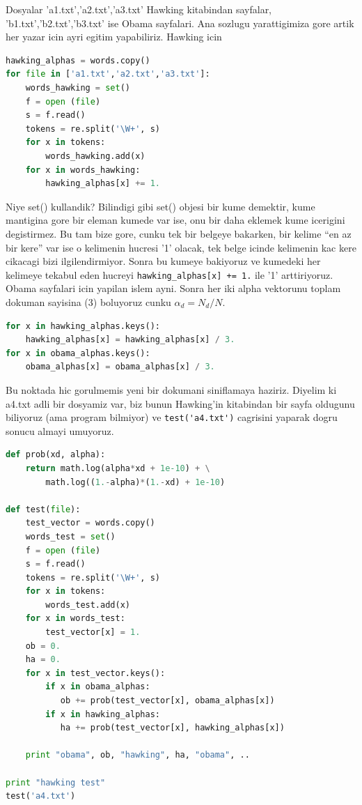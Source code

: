 \documentclass[12pt,fleqn]{article}
\begin{document}
Dosyalar 'a1.txt','a2.txt','a3.txt' Hawking kitabindan sayfalar,
'b1.txt','b2.txt','b3.txt' ise Obama sayfalari. Ana sozlugu yarattigimiza gore
artik her yazar icin ayri egitim yapabiliriz. Hawking icin 

\begin{lstlisting}[language=Python]
hawking_alphas = words.copy()   
for file in ['a1.txt','a2.txt','a3.txt']:
    words_hawking = set()
    f = open (file)
    s = f.read()
    tokens = re.split('\W+', s)
    for x in tokens: 
        words_hawking.add(x)
    for x in words_hawking:
        hawking_alphas[x] += 1.        
\end{lstlisting}

Niye set() kullandik? Bilindigi gibi set() objesi bir kume demektir, kume
mantigina gore bir eleman kumede var ise, onu bir daha eklemek kume icerigini
degistirmez. Bu tam bize gore, cunku tek bir belgeye bakarken, bir kelime ``en
az bir kere'' var ise o kelimenin hucresi '1' olacak, tek belge icinde kelimenin
kac kere cikacagi bizi ilgilendirmiyor. Sonra bu kumeye bakiyoruz ve kumedeki
her kelimeye tekabul eden hucreyi \verb!hawking_alphas[x] += 1.! ile '1'
arttiriyoruz. Obama sayfalari icin yapilan islem ayni. Sonra her iki alpha
vektorunu toplam dokuman sayisina (3) boluyoruz cunku $\alpha_d = N_d / N$.

\begin{lstlisting}[language=Python]
for x in hawking_alphas.keys():
    hawking_alphas[x] = hawking_alphas[x] / 3.        
for x in obama_alphas.keys():
    obama_alphas[x] = obama_alphas[x] / 3.        
\end{lstlisting}

Bu noktada hic gorulmemis yeni bir dokumani siniflamaya haziriz. Diyelim ki
a4.txt adli bir dosyamiz var, biz bunun Hawking'in kitabindan bir sayfa oldugunu
biliyoruz (ama program bilmiyor) ve \verb!test('a4.txt')! cagrisini yaparak dogru
sonucu almayi umuyoruz. 

\begin{lstlisting}[language=Python]
def prob(xd, alpha):
    return math.log(alpha*xd + 1e-10) + \
        math.log((1.-alpha)*(1.-xd) + 1e-10)
        
def test(file):
    test_vector = words.copy()   
    words_test = set()
    f = open (file)
    s = f.read()
    tokens = re.split('\W+', s)
    for x in tokens: 
        words_test.add(x)
    for x in words_test:  
        test_vector[x] = 1.
    ob = 0.
    ha = 0.
    for x in test_vector.keys(): 
        if x in obama_alphas: 
           ob += prob(test_vector[x], obama_alphas[x])
        if x in hawking_alphas: 
           ha += prob(test_vector[x], hawking_alphas[x])
                
    print "obama", ob, "hawking", ha, "obama", ..

print "hawking test"    
test('a4.txt')
\end{lstlisting}
\end{document}
